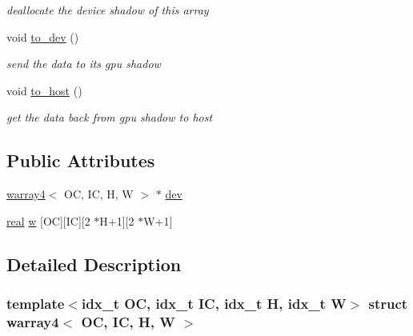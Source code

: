 \begin{DoxyCompactItemize}
\begin{DoxyCompactList}\small\item\em deallocate the device shadow of this array \end{DoxyCompactList}\item 
\mbox{\label{structwarray4_a091ba698395716da350bcd0ae3251d22}} 
void \hyperlink{structwarray4_a091ba698395716da350bcd0ae3251d22}{to\+\_\+dev} ()
\begin{DoxyCompactList}\small\item\em send the data to its gpu shadow \end{DoxyCompactList}\item 
\mbox{\label{structwarray4_abd26016c5d142fc5bf8e1b4f2194a728}} 
void \hyperlink{structwarray4_abd26016c5d142fc5bf8e1b4f2194a728}{to\+\_\+host} ()
\begin{DoxyCompactList}\small\item\em get the data back from gpu shadow to host \end{DoxyCompactList}\end{DoxyCompactItemize}
\subsection*{Public Attributes}
\begin{DoxyCompactItemize}
\item 
\hyperlink{structwarray4}{warray4}$<$ OC, IC, H, W $>$ $\ast$ \hyperlink{structwarray4_a6ee2499ec6fa4a631652d4752905a648}{dev}
\item 
\hyperlink{vgg__util_8h_a1082d08aaa761215ec83e7149f27ad16}{real} \hyperlink{structwarray4_a00b05df2c80beb4b1ab96c3b0fbc4550}{w} \mbox{[}OC\mbox{]}\mbox{[}IC\mbox{]}\mbox{[}2 $\ast$H+1\mbox{]}\mbox{[}2 $\ast$W+1\mbox{]}
\end{DoxyCompactItemize}


\subsection{Detailed Description}
\subsubsection*{template$<$idx\+\_\+t OC, idx\+\_\+t IC, idx\+\_\+t H, idx\+\_\+t W$>$\newline
struct warray4$<$ O\+C, I\+C, H, W $>$}

